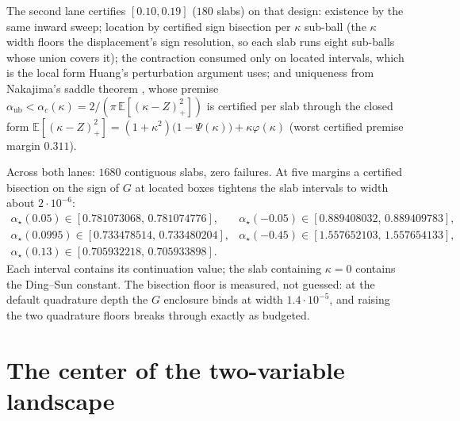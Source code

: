 \documentclass[11pt]{article}
\theoremstyle{remark}
\newcommand{\E}{\mathbb{E}}
\begin{document}
The second lane certifies $[0.10,0.19]$ ($180$ slabs) on that
design: existence by the same inward sweep; location by certified
sign bisection per $\kappa$ sub-ball (the $\kappa$ width floors the
displacement's sign resolution, so each slab runs eight sub-balls
whose union covers it); the contraction consumed only on located
intervals, which is the local form Huang's perturbation argument
uses; and uniqueness from Nakajima's saddle theorem
\cite{nakajima2025}, whose premise $\alpha_{\mathrm{ub}}<
\alpha_c(\kappa)=2/(\pi\,\E[(\kappa-Z)_+^2])$ is certified per slab
through the closed form
$\E[(\kappa-Z)_+^2]=(1+\kappa^2)\bigl(1-\Psi(\kappa)\bigr)
+\kappa\varphi(\kappa)$ (worst certified premise margin $0.311$).

Across both lanes: $1680$ contiguous slabs, zero failures.  At five
margins a certified bisection on the sign of $G$ at located boxes
tightens the slab intervals to width about $2\cdot10^{-6}$:
\[
\begin{array}{ll}
\alpha_\star(0.05)\in[0.781073068,\,0.781074776], &
\alpha_\star(-0.05)\in[0.889408032,\,0.889409783],\\
\alpha_\star(0.0995)\in[0.733478514,\,0.733480204], &
\alpha_\star(-0.45)\in[1.557652103,\,1.557654133],\\
\alpha_\star(0.13)\in[0.705932218,\,0.705933898]. &
\end{array}
\]
Each interval contains its continuation value; the slab containing
$\kappa=0$ contains the Ding--Sun constant.  The bisection floor is
measured, not guessed: at the default quadrature depth the $G$
enclosure binds at width $1.4\cdot10^{-5}$, and raising the two
quadrature floors breaks through exactly as budgeted.

\section{The center of the two-variable landscape}\label{sec:hessian}
\end{document}

